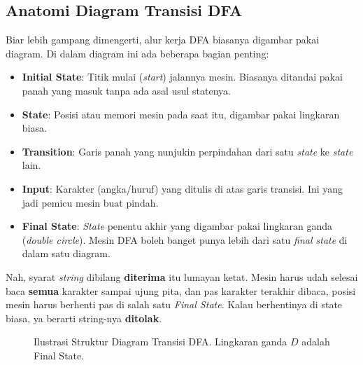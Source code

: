 \documentclass[12pt,a4paper]{article}
\begin{document}
\subsection{Anatomi Diagram Transisi DFA}
Biar lebih gampang dimengerti, alur kerja DFA biasanya digambar pakai diagram. Di dalam diagram ini ada beberapa bagian penting:
\begin{itemize}
    \item \textbf{Initial State}: Titik mulai (\textit{start}) jalannya mesin. Biasanya ditandai pakai panah yang masuk tanpa ada asal usul statenya.
    \item \textbf{State}: Posisi atau memori mesin pada saat itu, digambar pakai lingkaran biasa.
    \item \textbf{Transition}: Garis panah yang nunjukin perpindahan dari satu \textit{state} ke \textit{state} lain.
    \item \textbf{Input}: Karakter (angka/huruf) yang ditulis di atas garis transisi. Ini yang jadi pemicu mesin buat pindah.
    \item \textbf{Final State}: \textit{State} penentu akhir yang digambar pakai lingkaran ganda (\textit{double circle}). Mesin DFA boleh banget punya lebih dari satu \textit{final state} di dalam satu diagram.
\end{itemize}

Nah, syarat \textit{string} dibilang \textbf{diterima} itu lumayan ketat. Mesin harus udah selesai baca \textbf{semua} karakter sampai ujung pita, dan pas karakter terakhir dibaca, posisi mesin harus berhenti pas di salah satu \textit{Final State}. Kalau berhentinya di state biasa, ya berarti string-nya \textbf{ditolak}.

\begin{figure}[h]
    \centering
    \caption{Ilustrasi Struktur Diagram Transisi DFA. Lingkaran ganda $D$ adalah Final State.}
\end{figure}
\end{document}
